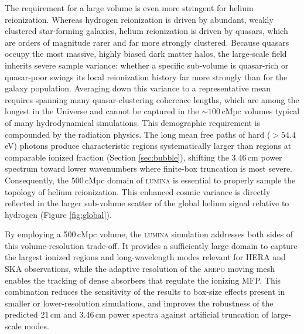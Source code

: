\documentclass[apj,twocolumn, appendixfloats, twocolappendix, numberedappendix, tighten]{openjournal}
\DeclareRobustCommand{\lumina}{\mbox{\textsc{lumina}}\xspace}
\begin{document}
The requirement for a large volume is even more stringent for helium reionization. Whereas hydrogen reionization is driven by abundant, weakly clustered star-forming galaxies, helium reionization is driven by quasars, which are orders of magnitude rarer and far more strongly clustered. Because quasars occupy the most massive, highly biased dark matter halos, the large-scale  field inherits severe sample variance: whether a specific sub-volume is quasar-rich or quasar-poor swings its  local reionization history far more strongly than for the galaxy population. Averaging down this variance to a representative mean requires spanning many quasar-clustering coherence lengths, which are among the longest in the Universe and cannot be captured in the $\sim 100\,\mathrm{cMpc}$ volumes typical of many hydrodynamical simulations. This demographic requirement is compounded by the radiation physics. The long mean free paths of hard ($>54.4$\,eV) photons produce characteristic  regions systematically larger than  regions at comparable ionized fraction (Section \ref{sec:bubble}), shifting the 3.46\,cm power spectrum toward lower wavenumbers where finite-box truncation is most severe. Consequently, the 500\,cMpc domain of \lumina is essential to properly sample the topology of helium reionization. This enhanced cosmic variance is directly reflected in the larger sub-volume scatter of the global helium signal relative to hydrogen (Figure \ref{fig:global}).


By employing a 500\,cMpc volume, the \lumina simulation addresses both sides of this volume-resolution trade-off. It provides a sufficiently large domain to capture the largest ionized regions and long-wavelength modes relevant for HERA and SKA observations, while the adaptive resolution of the \textsc{arepo} moving mesh enables the tracking of dense absorbers that regulate the ionizing MFP. This combination reduces the sensitivity of the results to box-size effects present in smaller or lower-resolution simulations, and improves the robustness of the predicted 21\,cm and 3.46\,cm power spectra against artificial truncation of large-scale modes.


\end{document}
